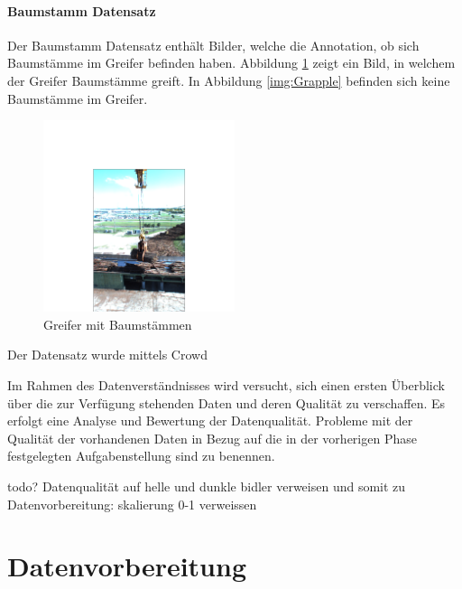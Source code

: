 		\paragraph{Baumstamm Datensatz} Der Baumstamm Datensatz enthält Bilder, welche die Annotation, ob sich Baumstämme im Greifer befinden haben. Abbildung \ref{img:Logs} zeigt ein Bild, in welchem der Greifer Baumstämme greift. In Abbildung \ref{img:Grapple} befinden sich keine Baumstämme im Greifer.
		\begin{figure}[h]
			\centering
			\includegraphics[width=0.5\textwidth, center]{bilder/Grundlagen/Logs_14.png}
			\caption[Bsp. Bild: Greifer mit Baumstämmen]{Greifer mit Baumstämmen}
			\label{img:Logs}
		\end{figure}
		Der Datensatz wurde mittels Crowd
			
		

				
			
				 Im Rahmen des Datenverständnisses wird versucht, sich einen ersten Überblick über die zur Verfügung stehenden Daten und deren Qualität zu verschaffen. Es erfolgt eine Analyse und Bewertung der Datenqualität. Probleme mit der Qualität der vorhandenen Daten in Bezug auf die in der vorherigen Phase festgelegten Aufgabenstellung sind zu benennen.
			
			todo? Datenqualität auf helle und dunkle bidler verweisen und somit zu Datenvorbereitung: skalierung 0-1 verweissen
		
	\section{Datenvorbereitung}
	\label{sec:DataPreparation}

